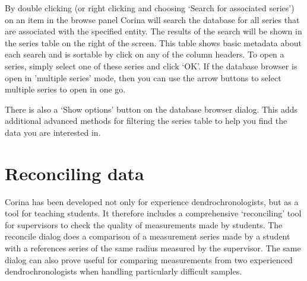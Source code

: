 By double clicking (or right clicking and choosing `Search for associated series') on an item in the browse panel Corina will search the database for all series that are associated with the specified entity.  The results of the search will be shown in the series table on the right of the screen.  This table shows basic metadata about each search and is sortable by click on any of the column headers.  To open a series, simply select one of these series and click `OK'.  If the database browser is open in 'multiple series' mode, then you can use the arrow buttons to select multiple series to open in one go.

There is also a `Show options' button on the database browser dialog.  This adds additional advanced methods for filtering the series table to help you find the data you are interested in.

\section{Reconciling data}
Corina has been developed not only for experience dendrochronologists, but as a tool for teaching students.  It therefore includes a comprehensive `reconciling' tool for supervisors to check the quality of measurements made by students.  The reconcile dialog does a comparison of a measurement series made by a student with a references series of the same radius measured by the supervisor.  The same dialog can also prove useful for comparing measurements from two experienced dendrochronologists when handling particularly difficult samples.

 


